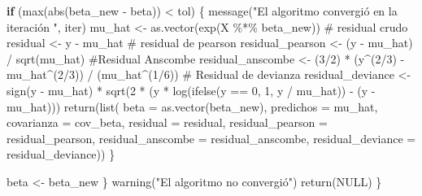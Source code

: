 \documentclass[
  letterpaper,
  DIV=11,
  numbers=noendperiod]{scrartcl}
\newenvironment{Shaded}{\begin{snugshade}}{\end{snugshade}}
\newcommand{\AttributeTok}[1]{\textcolor[rgb]{0.40,0.45,0.13}{#1}}
\newcommand{\CommentTok}[1]{\textcolor[rgb]{0.37,0.37,0.37}{#1}}
\newcommand{\ConstantTok}[1]{\textcolor[rgb]{0.56,0.35,0.01}{#1}}
\newcommand{\ControlFlowTok}[1]{\textcolor[rgb]{0.00,0.23,0.31}{\textbf{#1}}}
\newcommand{\DecValTok}[1]{\textcolor[rgb]{0.68,0.00,0.00}{#1}}
\newcommand{\FunctionTok}[1]{\textcolor[rgb]{0.28,0.35,0.67}{#1}}
\newcommand{\NormalTok}[1]{\textcolor[rgb]{0.00,0.23,0.31}{#1}}
\newcommand{\OtherTok}[1]{\textcolor[rgb]{0.00,0.23,0.31}{#1}}
\newcommand{\SpecialCharTok}[1]{\textcolor[rgb]{0.37,0.37,0.37}{#1}}
\newcommand{\StringTok}[1]{\textcolor[rgb]{0.13,0.47,0.30}{#1}}
\begin{document}
\begin{Shaded}
\begin{Highlighting}[]
    \ControlFlowTok{if}\NormalTok{ (}\FunctionTok{max}\NormalTok{(}\FunctionTok{abs}\NormalTok{(beta\_new }\SpecialCharTok{{-}}\NormalTok{ beta)) }\SpecialCharTok{\textless{}}\NormalTok{ tol) \{}
      \FunctionTok{message}\NormalTok{(}\StringTok{"El algoritmo convergió en la iteración "}\NormalTok{, iter)}
\NormalTok{      mu\_hat }\OtherTok{\textless{}{-}} \FunctionTok{as.vector}\NormalTok{(}\FunctionTok{exp}\NormalTok{(X }\SpecialCharTok{\%*\%}\NormalTok{ beta\_new))}
      \CommentTok{\# residual crudo}
\NormalTok{      residual }\OtherTok{\textless{}{-}}\NormalTok{ y }\SpecialCharTok{{-}}\NormalTok{ mu\_hat}
      \CommentTok{\# residual de pearson}
\NormalTok{      residual\_pearson }\OtherTok{\textless{}{-}}\NormalTok{ (y }\SpecialCharTok{{-}}\NormalTok{ mu\_hat) }\SpecialCharTok{/} \FunctionTok{sqrt}\NormalTok{(mu\_hat)}
      \CommentTok{\#Residual Anscombe}
\NormalTok{      residual\_anscombe }\OtherTok{\textless{}{-}}\NormalTok{ (}\DecValTok{3}\SpecialCharTok{/}\DecValTok{2}\NormalTok{) }\SpecialCharTok{*}\NormalTok{ (y}\SpecialCharTok{\^{}}\NormalTok{(}\DecValTok{2}\SpecialCharTok{/}\DecValTok{3}\NormalTok{) }\SpecialCharTok{{-}}\NormalTok{ mu\_hat}\SpecialCharTok{\^{}}\NormalTok{(}\DecValTok{2}\SpecialCharTok{/}\DecValTok{3}\NormalTok{)) }\SpecialCharTok{/}\NormalTok{ (mu\_hat}\SpecialCharTok{\^{}}\NormalTok{(}\DecValTok{1}\SpecialCharTok{/}\DecValTok{6}\NormalTok{))}
      \CommentTok{\# Residual de devianza}
\NormalTok{      residual\_deviance }\OtherTok{\textless{}{-}} \FunctionTok{sign}\NormalTok{(y }\SpecialCharTok{{-}}\NormalTok{ mu\_hat) }\SpecialCharTok{*} \FunctionTok{sqrt}\NormalTok{(}\DecValTok{2} \SpecialCharTok{*}\NormalTok{ (y }\SpecialCharTok{*} \FunctionTok{log}\NormalTok{(}\FunctionTok{ifelse}\NormalTok{(y }\SpecialCharTok{==} \DecValTok{0}\NormalTok{, }\DecValTok{1}\NormalTok{, y }\SpecialCharTok{/}\NormalTok{ mu\_hat)) }\SpecialCharTok{{-}}\NormalTok{ (y }\SpecialCharTok{{-}}\NormalTok{ mu\_hat)))}
      \FunctionTok{return}\NormalTok{(}\FunctionTok{list}\NormalTok{( }\AttributeTok{beta =} \FunctionTok{as.vector}\NormalTok{(beta\_new), }\AttributeTok{predichos =}\NormalTok{ mu\_hat, }\AttributeTok{covarianza =}\NormalTok{ cov\_beta, }\AttributeTok{residual =}\NormalTok{ residual,}
                   \AttributeTok{residual\_pearson =}\NormalTok{ residual\_pearson,}
                   \AttributeTok{residual\_anscombe =}\NormalTok{ residual\_anscombe,}
                   \AttributeTok{residual\_deviance =}\NormalTok{ residual\_deviance))}
\NormalTok{    \}}
    
\NormalTok{    beta }\OtherTok{\textless{}{-}}\NormalTok{ beta\_new}
\NormalTok{  \}}
  \FunctionTok{warning}\NormalTok{(}\StringTok{"El algoritmo no convergió"}\NormalTok{)}
  \FunctionTok{return}\NormalTok{(}\ConstantTok{NULL}\NormalTok{)}
\NormalTok{\}}
\end{Highlighting}
\end{Shaded}
\end{document}
